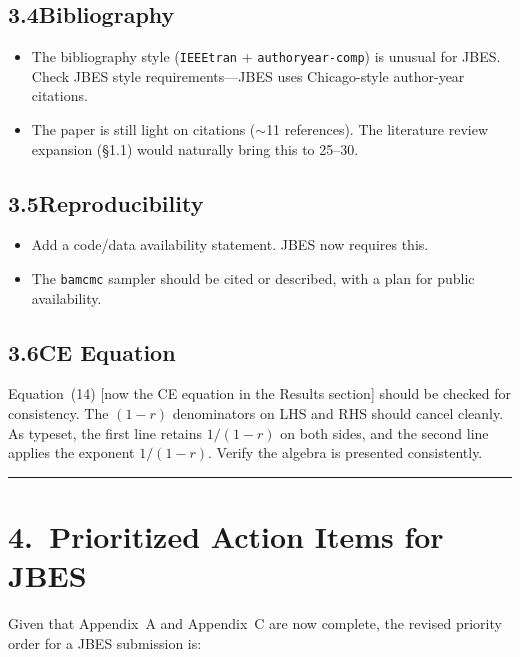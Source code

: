\documentclass[12pt,a4paper]{article}
\begin{document}
\subsection{3.4\quad Bibliography}

\begin{itemize}[leftmargin=1.5em]
\item The bibliography style (\texttt{IEEEtran} + \texttt{authoryear-comp}) is
unusual for JBES\@.  Check JBES style requirements---JBES uses Chicago-style
author-year citations.
\item The paper is still light on citations (${\sim}$11 references).  The
literature review expansion (\S1.1) would naturally bring this to 25--30.
\end{itemize}

\subsection{3.5\quad Reproducibility}

\begin{itemize}[leftmargin=1.5em]
\item Add a code/data availability statement.  JBES now requires this.
\item The \texttt{bamcmc} sampler should be cited or described, with a plan for
public availability.
\end{itemize}

\subsection{3.6\quad CE Equation}

Equation~(14) [now the CE equation in the Results section] should be checked for
consistency.  The $(1-r)$ denominators on LHS and RHS should cancel cleanly.
As typeset, the first line retains $1/(1-r)$ on both sides, and the second line
applies the exponent $1/(1-r)$.  Verify the algebra is presented consistently.

\vspace{0.5em}
\hrule
\vspace{0.5em}

\section{4.\ Prioritized Action Items for JBES}

Given that Appendix~A and Appendix~C are now complete, the revised priority
order for a JBES submission is:
\end{document}
